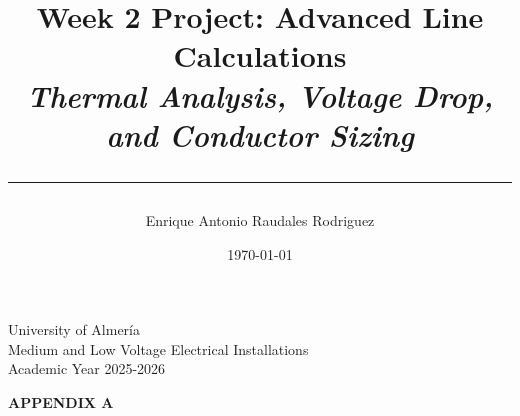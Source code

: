 \documentclass[12pt, a4paper]{article}
\title{
    \vspace{4cm} %
    \textbf{Week 2 Project: Advanced Line Calculations} \\
    \large \textit{Thermal Analysis, Voltage Drop, and Conductor Sizing} \\
    \vspace{1cm} %
    \rule{\textwidth}{0.4pt} %
}
\author{Enrique Antonio Raudales Rodriguez}
\date{\today}
\begin{document}
\begin{titlepage}
    \maketitle
    \vfill %
    \begin{center}
        \large University of Almería \\
        Medium and Low Voltage Electrical Installations \\
        Academic Year 2025-2026
    \end{center}
\end{titlepage}


\newpage
\appendix

\begin{center}\textbf{APPENDIX A}\end{center}
\end{document}
